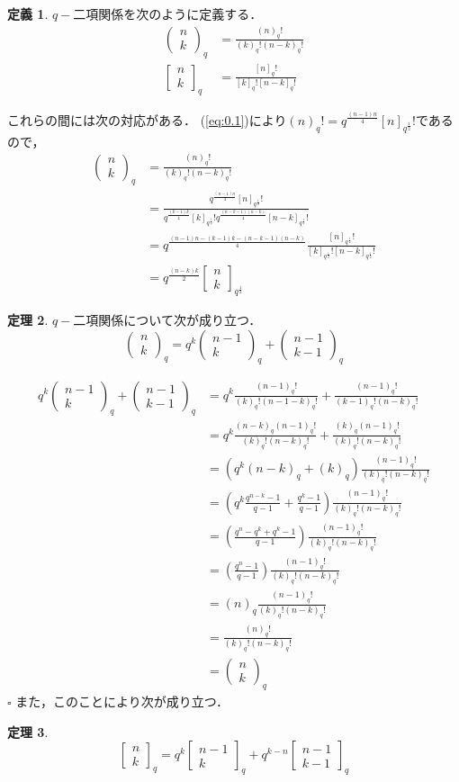 \documentclass{article}
\makeatletter
\theoremstyle{definition}
\newtheorem{theorem}{定理}[section]
\newtheorem{definition}[theorem]{定義}
\renewenvironment{proof}[1][(証明)]{\par
  \normalfont
  \topsep6\p@\@plus6\p@ \trivlist
  \item[\hskip\labelsep{#1}]\ignorespaces
}{\hfill$\square$\endtrivlist}	%
\numberwithin{equation}{section}
\newcommand{\1}{\mathbb{1}}
\newcommand{\2}{\mathbb{2}}
\renewcommand{\.}{\hspace{2mm}}
\newcommand{\qbinom}[3]{
  \begin{pmatrix}
    #1 \\
    #2
  \end{pmatrix}_{#3}
}
\newcommand{\qBinom}[3]{
  \begin{bmatrix}
    #1 \\
    #2
  \end{bmatrix}_{#3}
}
\makeatother
\begin{document}
\begin{definition}
  $q-$二項関係を次のように定義する．
  \begin{align*}
    \qbinom{n}{k}{q}&=\frac{(n)_q!}{(k)_q!(n-k)_q!} \\
    \qBinom{n}{k}{q}&=\frac{[n]_q!}{[k]_q![n-k]_q!}
  \end{align*}
\end{definition}
これらの間には次の対応がある．
(\ref{eq:0.1})により$(n)_{q}! =q^{\frac{(n-1)n}{4}}[n]_{q^\frac{1}{2}}!$であるので，
\begin{align}
  \qbinom{n}{k}{q}&=\frac{(n)_q!}{(k)_q!(n-k)_q!} \nonumber \\
  &=\frac{q^{\frac{(n-1)n}{4}}[n]_{q^\frac{1}{2}}!}{q^{\frac{(k-1)k}{4}}[k]_{q^\frac{1}{2}}!q^{\frac{(n-k-1)(n-k)}{4}}[n-k]_{q^\frac{1}{2}}!} \nonumber \\
  &=q^\frac{(n-1)n-(k-1)k-(n-k-1)(n-k)}{4}\frac{[n]_{q^\frac{1}{2}}!}{[k]_{q^\frac{1}{2}}![n-k]_{q^\frac{1}{2}}!} \nonumber \\
  &=q^\frac{(n-k)k}{2}\qBinom{n}{k}{q^\frac{1}{2}} \label{eq:0.2}
\end{align}
\begin{theorem}
  $q-$二項関係について次が成り立つ．
  \[
    \qbinom{n}{k}{q}=q^k\qbinom{n-1}{k}{q}+\qbinom{n-1}{k-1}{q}
  \]
\end{theorem}
\begin{proof}
  \begin{align*}
    q^k\qbinom{n-1}{k}{q}+\qbinom{n-1}{k-1}{q}&=q^k\frac{(n-1)_q!}{(k)_q!(n-1-k)_q!}+\frac{(n-1)_q!}{(k-1)_q!(n-k)_q!}\\
    &=q^k\frac{(n-k)_q(n-1)_q!}{(k)_q!(n-k)_q!}+\frac{(k)_q(n-1)_q!}{(k)_q!(n-k)_q!}\\
    &=(q^k(n-k)_q+(k)_q)\frac{(n-1)_q!}{(k)_q!(n-k)_q!}\\
    &=\left(q^k\frac{q^{n-k}-1}{q-1}+\frac{q^k-1}{q-1}\right)\frac{(n-1)_q!}{(k)_q!(n-k)_q!}\\
    &=\left(\frac{q^n-q^k+q^k-1}{q-1}\right)\frac{(n-1)_q!}{(k)_q!(n-k)_q!}\\
    &=\left(\frac{q^n-1}{q-1}\right)\frac{(n-1)_q!}{(k)_q!(n-k)_q!}\\
    &=(n)_q\frac{(n-1)_q!}{(k)_q!(n-k)_q!}\\
    &=\frac{(n)_q!}{(k)_q!(n-k)_q!}\\
    &=\qbinom{n}{k}{q}
  \end{align*}
\end{proof}
また，このことにより次が成り立つ．
\begin{theorem}
  \[
  \qBinom{n}{k}{q}=q^k\qBinom{n-1}{k}{q}+q^{k-n}\qBinom{n-1}{k-1}{q}
  \]
\end{theorem}
\end{document}
